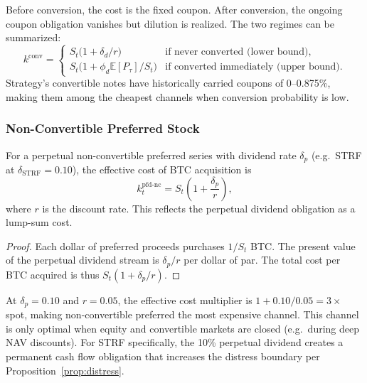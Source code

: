 \begin{remark}
Before conversion, the cost is the fixed coupon.  After conversion, the
ongoing coupon obligation vanishes but dilution is realized.  The two
regimes can be summarized:
\begin{equation}\label{eq:conv_regimes}
  k^{\mathrm{conv}} =
  \begin{cases}
    S_t\bigl(1 + \delta_d / r\bigr) & \text{if never converted (lower bound)}, \\
    S_t\bigl(1 + \phi_d \mathbb{E}[P_\tau] / S_t\bigr)
      & \text{if converted immediately (upper bound)}.
  \end{cases}
\end{equation}
Strategy's convertible notes have historically carried coupons of 0--0.875\%,
making them among the cheapest channels when conversion probability is low.
\end{remark}

\subsubsection{Non-Convertible Preferred Stock}

\begin{proposition}\label{prop:cost_pfd_nc}
For a perpetual non-convertible preferred series with dividend rate
$\delta_p$ (e.g.\ STRF at $\delta_{\mathrm{STRF}} = 0.10$), the effective
cost of BTC acquisition is
\begin{equation}\label{eq:k_pfd_nc}
  k_t^{\mathrm{pfd\text{-}nc}}
  = S_t \left(1 + \frac{\delta_p}{r}\right),
\end{equation}
where $r$ is the discount rate.  This reflects the perpetual dividend
obligation as a lump-sum cost.
\end{proposition}

\begin{proof}
Each dollar of preferred proceeds purchases $1/S_t$ BTC.  The present value
of the perpetual dividend stream is $\delta_p / r$ per dollar of par.  The
total cost per BTC acquired is thus $S_t(1 + \delta_p / r)$.
\end{proof}

\begin{remark}
At $\delta_p = 0.10$ and $r = 0.05$, the effective cost multiplier is
$1 + 0.10/0.05 = 3\times$ spot, making non-convertible preferred the most
expensive channel.  This channel is only optimal when equity and convertible
markets are closed (e.g.\ during deep NAV discounts).  For STRF specifically,
the 10\% perpetual dividend creates a permanent cash flow obligation that
increases the distress boundary per Proposition~\ref{prop:distress}.
\end{remark}

